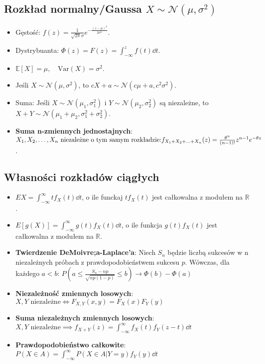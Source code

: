 \documentclass{article}
\theoremstyle{definition}
\theoremstyle{remark}
\begin{document}
\begin{multicols}{2}
    \subsection*{Rozkład normalny/Gaussa \( X \sim \mathcal{N}(\mu, \sigma^2) \)}
    \begin{itemize}[itemsep=0pt, left=0pt]
        \item Gęstość: \( f(z) = \frac{1}{\sqrt{2\pi}\sigma} e^{-\frac{(z-\mu)^2}{2\sigma^2}} \).
        \item Dystrybuanta: \(\Phi(z)=F(z) = \int_{-\infty}^{z} f(t) \dd{t}\).
        \item \(\mathbb{E}[X] = \mu, \quad \text{Var}(X) = \sigma^2\).
        \item Jeśli \(X \sim \mathcal{N}(\mu, \sigma^2)\), to \(cX+a \sim \mathcal{N}(c\mu+a, c^2\sigma^2)\).
        \item Suma: Jeśli \( X \sim \mathcal{N}(\mu_1, \sigma_1^2) \) i \( Y \sim \mathcal{N}(\mu_2, \sigma_2^2) \) są niezależne, to \( X+Y \sim \mathcal{N}(\mu_1+\mu_2, \sigma_1^2+\sigma_2^2) \).
        \item \textbf{Suma n-zmiennych jednostajnych}: \(X_1, X_2, \ldots, X_n \\
        \text{ niezależne o tym samym rozkładzie:} \\
         f_{X_1 + X_2 + \ldots + X_n}(z) =  \frac{\theta^n}{(n-1)!}z^{n-1}e^{-\theta z}\).
    \end{itemize}

    \subsection*{Własności rozkładów ciągłych}

    \begin{itemize}[itemsep=0pt, left=0pt]
        \item \(EX = \int_{-\infty}^{\infty}{tf_X(t) \dd{t}}\), o ile funckaj \(tf_X(t)\) jest całkowalna z modułem na \(\mathbb{R}\).
        \item \(E[g(X)] = \int_{-\infty}^{\infty}{g(t)f_X(t) \dd{t}}\), o ile funkcja \(g(t)f_X(t)\) jest całkowalna z modułem na \(\mathbb{R}\).
        \item \textbf{Twierdzenie DeMoivre;a-Laplace'a}: Niech \(S_n\) będzie liczbą sukcesów w n niezależnych próbach z
        prawdopodobieństwem sukcesu \(p\). Wówczas, dla każdego \(a < b\): \(P(a \leq \frac{S_n - np}{\sqrt{np(1-p)}} \leq b) \to \Phi(b) - \Phi(a)\)
        \item \textbf{Niezależność zmiennych losowych}: \(X,Y \text{ niezależne} \iff F_{X,Y}(x,y) = F_X(x)F_Y(y)\)
        \item \textbf{Suma niezależnych zmiennych losowych}: \(X,Y \text{ niezależne} \implies f_{X+Y}(z) = \int_{-\infty}^{\infty}{f_X(t)f_Y(z-t) \dd{t}}\)
        \item \textbf{Prawdopodobieństwo całkowite}: \(P(X \in A) = \int_{-\infty}^{\infty}{P(X \in A | Y = y) f_Y(y) \dd{t}}\)
    \end{itemize}



\end{multicols}
\end{document}
